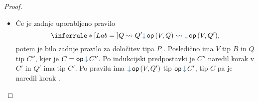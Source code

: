 \begin{proof}
\begin{itemize}
		\item Če je zadnje uporabljeno pravilo
		$$
		\coopinfer{}{
			Q \reduces Q'
		}{
			\tmopin{op}{V}{Q}  \reduces \tmopin{op}{V}{Q'}
		},$$
		potem je bilo zadnje pravilo za določitev tipa $P$ .
		Posledično ima $V$ tip $B$ in $Q$ tip $C''$, kjer je $C = \opincomp{op}{C''}$.
		Po indukcijski predpostavki je $C''$ naredil korak v $C'$ in $Q'$ ima tip $C'$.
		Po pravilu  ima $\tmopin{op}{V}{Q'}$ tip $\opincomp{op}{C'}$, tip $C$ pa je naredil korak .
	\end{itemize}

\end{proof}


